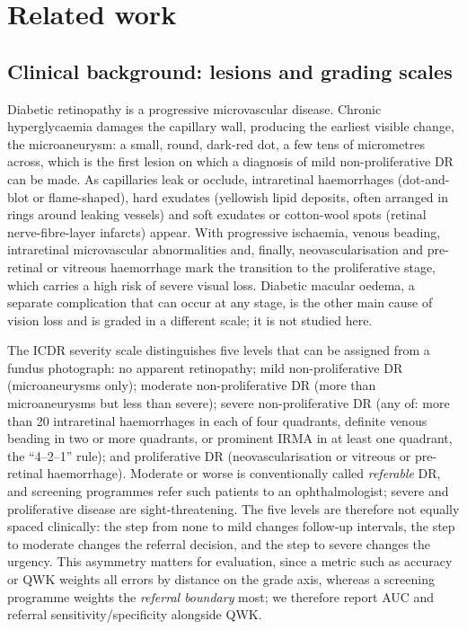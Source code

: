 \section{Related work}
\label{sec:related}

\subsection{Clinical background: lesions and grading scales}
Diabetic retinopathy is a progressive microvascular disease. Chronic hyperglycaemia damages the capillary wall, producing the earliest visible change, the microaneurysm: a small, round, dark-red dot, a few tens of micrometres across, which is the first lesion on which a diagnosis of mild non-proliferative DR can be made. As capillaries leak or occlude, intraretinal haemorrhages (dot-and-blot or flame-shaped), hard exudates (yellowish lipid deposits, often arranged in rings around leaking vessels) and soft exudates or cotton-wool spots (retinal nerve-fibre-layer infarcts) appear. With progressive ischaemia, venous beading, intraretinal microvascular abnormalities and, finally, neovascularisation and pre-retinal or vitreous haemorrhage mark the transition to the proliferative stage, which carries a high risk of severe visual loss. Diabetic macular oedema, a separate complication that can occur at any stage, is the other main cause of vision loss and is graded in a different scale; it is not studied here.

The ICDR severity scale \citep{wilkinson2003} distinguishes five levels that can be assigned from a fundus photograph: no apparent retinopathy; mild non-proliferative DR (microaneurysms only); moderate non-proliferative DR (more than microaneurysms but less than severe); severe non-proliferative DR (any of: more than 20 intraretinal haemorrhages in each of four quadrants, definite venous beading in two or more quadrants, or prominent IRMA in at least one quadrant, the ``4--2--1'' rule); and proliferative DR (neovascularisation or vitreous or pre-retinal haemorrhage). Moderate or worse is conventionally called \emph{referable} DR, and screening programmes refer such patients to an ophthalmologist; severe and proliferative disease are sight-threatening. The five levels are therefore not equally spaced clinically: the step from none to mild changes follow-up intervals, the step to moderate changes the referral decision, and the step to severe changes the urgency. This asymmetry matters for evaluation, since a metric such as accuracy or QWK weights all errors by distance on the grade axis, whereas a screening programme weights the \emph{referral boundary} most; we therefore report AUC and referral sensitivity/specificity alongside QWK.

